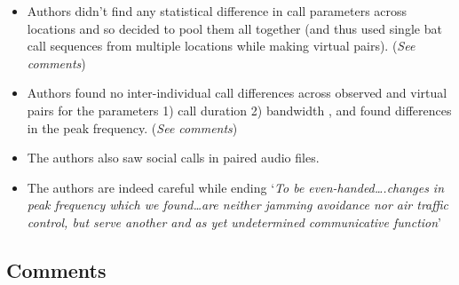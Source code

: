 \documentclass[
]{book}
\providecommand{\tightlist}{%
  \setlength{\itemsep}{0pt}\setlength{\parskip}{0pt}}
\begin{document}
\begin{itemize}
\tightlist
\item
  Authors didn't find any statistical difference in call parameters across locations and so decided to pool them all together (and thus used single bat call sequences from multiple locations while making virtual pairs). (\emph{See comments})
\item
  Authors found no inter-individual call differences across observed and virtual pairs for the parameters 1) call duration 2) bandwidth , and found differences in the peak frequency. (\emph{See comments})
\item
  The authors also saw social calls in paired audio files.
\item
  The authors are indeed careful while ending `\emph{To be even-handed\ldots.changes in peak frequency which we found\ldots are neither jamming avoidance nor air traffic control, but serve another and as yet undetermined communicative function}'
\end{itemize}

\hypertarget{comments}{%
\subsection{Comments}\label{comments}}
\end{document}

